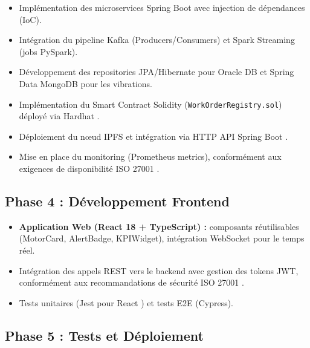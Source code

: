 \documentclass[12pt, a4paper, oneside]{report}
\begin{document}
\begin{itemize}
  \item Implémentation des microservices Spring Boot \cite{springboot} avec injection de dépendances (IoC).
  \item Intégration du pipeline Kafka \cite{kafka} (Producers/Consumers) et Spark Streaming \cite{spark} (jobs PySpark).
  \item Développement des repositories JPA/Hibernate pour Oracle DB et Spring Data MongoDB pour les vibrations.
  \item Implémentation du Smart Contract Solidity \cite{ethereum} (\texttt{WorkOrderRegistry.sol})
  déployé via Hardhat \cite{hardhat}.
  \item Déploiement du nœud IPFS \cite{ipfs} et intégration via HTTP API Spring Boot \cite{springboot}.
  \item Mise en place du monitoring (Prometheus metrics), conformément aux
  exigences de disponibilité ISO 27001 \cite{iso27001}.
\end{itemize}

\subsection{Phase 4 : Développement Frontend}

\begin{itemize}
  \item \textbf{Application Web (React 18 \cite{react} + TypeScript) :} composants réutilisables
  (MotorCard, AlertBadge, KPIWidget), intégration WebSocket pour le temps réel.
  \item Intégration des appels REST vers le backend avec gestion des tokens JWT, conformément
  aux recommandations de sécurité ISO 27001 \cite{iso27001}.
  \item Tests unitaires (Jest pour React \cite{react}) et tests E2E (Cypress).
\end{itemize}

\subsection{Phase 5 : Tests et Déploiement}
\end{document}
